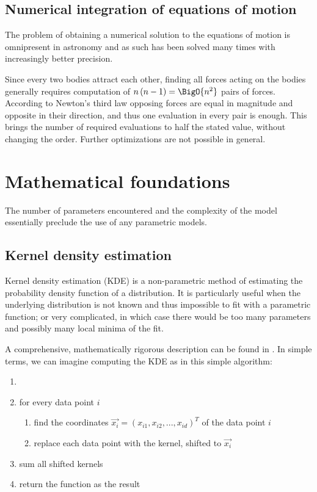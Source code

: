     \subsection{Numerical integration of equations of motion} \label{msi}
        The problem of obtaining a numerical solution to the equations of motion is omnipresent
        in astronomy and as such has been solved many times with increasingly better precision.

        Since every two bodies attract each other, finding all forces acting on the bodies generally
        requires computation of $n\left(n - 1\right) = \BigO{n^2}$ pairs of forces.
        According to Newton's third law opposing forces are equal in magnitude and opposite in their direction,
        and thus one evaluation in every pair is enough.
        This brings the number of required evaluations to half the stated value, without changing the order.
        Further optimizations are not possible in general.

\section{Mathematical foundations} \label{mm}

    The number of parameters encountered and the complexity of the model essentially preclude the use of any parametric models.

    \subsection{Kernel density estimation} \label{mmk}
        Kernel density estimation (KDE) is a non-parametric method of estimating the probability density function
        of a distribution. It is particularly useful when the underlying distribution is not known and thus impossible
        to fit with a parametric function; or very complicated, in which case there would be too many parameters
        and possibly many local minima of the fit.

        A comprehensive, mathematically rigorous description can be found in \citep{hwang+1994}.
        In simple terms, we can imagine computing the KDE as in this simple algorithm:
        \begin{enumerate}
            \item 
            \item for every data point $i$
                \begin{enumerate}[label=\arabic*.]
                \item find the coordinates $\vec{x_i} = (x_{i1}, x_{i2}, ..., x_{id})^T$ of the data point $i$
                \item replace each data point with the kernel, shifted to $\vec{x_i}$
            \end{enumerate}
            \item sum all shifted kernels
            \item return the function as the result
        \end{enumerate}

